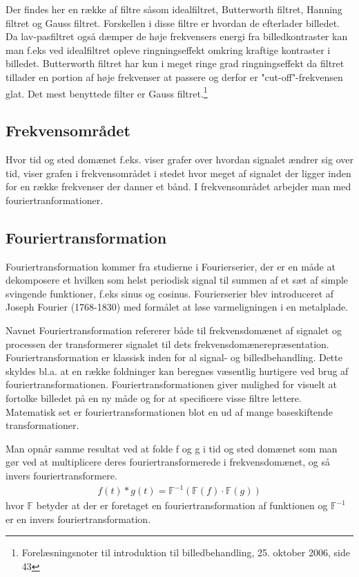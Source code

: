 Der findes her en række af filtre såsom idealfiltret, Butterworth filtret, Hanning filtret og Gauss filtret. Forskellen i disse filtre er hvordan de efterlader billedet. Da lav-pasfiltret også dæmper de høje frekvensers energi fra billedkontraster kan man f.eks ved idealfiltret opleve ringningseffekt omkring kraftige kontraster i billedet. Butterworth filtret har kun i meget ringe grad ringningseffekt da filtret tillader en portion af høje frekvenser at passere og derfor er "cut-off"-frekvensen glat. Det mest benyttede filter er Gauss filtret.\footnote{Forelæsningsnoter til introduktion til billedbehandling, 25. oktober 2006, side 43}

\subsection{Frekvensområdet}
Hvor tid og sted domænet f.eks. viser grafer over hvordan signalet ændrer sig over tid, viser grafen i frekvensområdet i stedet hvor meget af signalet der ligger inden for en række frekvenser der danner et bånd. I frekvensområdet arbejder man med fouriertranformationer.

\subsection{Fouriertransformation}
Fouriertransformation kommer fra studierne i Fourierserier, der er en måde at dekomposere et hvilken som helst periodisk signal til summen af et sæt af simple svingende funktioner, f.eks sinus og cosinus. Fourierserier blev introduceret af Joseph Fourier (1768-1830) med formålet at løse varmeligningen i en metalplade.

Navnet Fouriertransformation refererer både til frekvensdomænet af signalet og processen der transformerer signalet til dets frekvensdomænerepræsentation. Fouriertransformation er klassisk inden for al signal- og billedbehandling. Dette skyldes bl.a. at en række foldninger kan beregnes væsentlig hurtigere ved brug af fouriertransformationen. Fouriertransformationen giver mulighed for visuelt at fortolke billedet på en ny måde og for at specificere visse filtre lettere. Matematisk set er fouriertransformationen blot en ud af mange baseskiftende transformationer.

Man opnår samme resultat ved at folde f og g i tid og sted domænet som man gør ved at multiplicere deres fouriertransformerede i frekvensdomænet, og så invers fouriertransformere.
\begin{align}
	f(t)*g(t) = \mathbb{F}^{-1}(\mathbb{F}(f)\cdot\mathbb{F}(g))
\end{align}
hvor $\mathbb{F}$ betyder at der er foretaget en fouriertransformation af funktionen og $\mathbb{F}^{-1}$ er en invers fouriertransformation.

 
